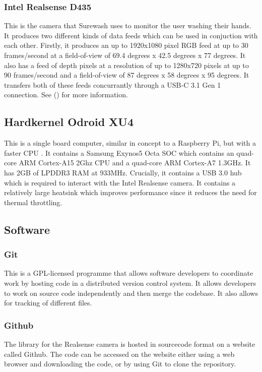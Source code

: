         \subsubsection{Intel Realsense D435}
        This is the camera that Surewash uses to monitor the user washing their hands. It produces two different kinds of data feeds which can be used in conjuction with each other. Firstly, it produces an up to 1920x1080 pixel RGB feed at up to 30 frames/second at a field-of-view of 69.4 degrees x 42.5 degrees x 77 degrees. It also has a feed of depth pixels at a resolution of up to 1280x720 pixels at up to 90 frames/second and a field-of-view of 87 degrees x 58 degrees x 95 degrees. It transfers both of these feeds concurrantly through a USB‑C 3.1 Gen 1 connection. See (\cite{d435}) for more information.
        \subsection{Hardkernel Odroid XU4}
        This is a single board computer, similar in concept to a Raspberry Pi, but with a faster CPU \cite{odroid_xu4}. It contains a Samsung Exynos5 Octa SOC which contains an quad-core ARM Cortex-A15 2Ghz CPU and a quad-core ARM Cortex-A7 1.3GHz. It has 2GB of LPDDR3 RAM at 933MHz. Crucially, it contains a USB 3.0 hub which is required to interact with the Intel Realsense camera. It contains a relatively large heatsink which improves performance since it reduces the need for thermal throttling.
    
    \subsection{Software}
        \subsubsection{Git}
        This is a GPL-licensed programme that allows software developers to coordinate work by hosting code in a distributed version control system. It allows developers to work on source code independently and then merge the codebase. It also allows for tracking of different files.
        \subsubsection{Github}
        The library for the Realsense camera is hosted in sourcecode format on a website called Github. The code can be accessed on the website either using a web browser and downloading the code, or by using Git to clone the repository.

